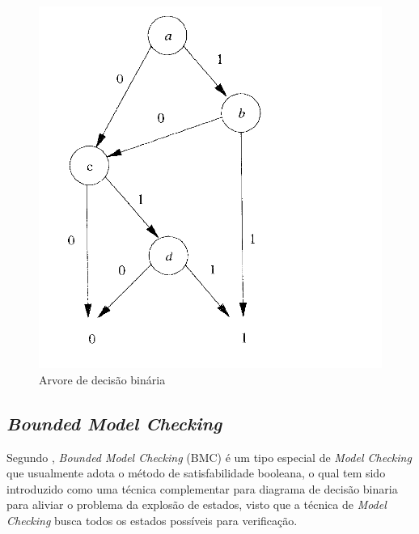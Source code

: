 \begin{figure}[htb]
	\begin{center}
    \caption{\label{fig:bdd_fig}Arvore de decisão binária}
	\includegraphics[scale=0.30]{Figuras/Arvore_BDD.png}
	\end{center}
\end{figure}



\subsection{\label{cap:bounded}\textit{Bounded Model Checking}}
Segundo \citeauthor{rocha2015verificaccao}, \textit{Bounded Model Checking} (BMC) é um tipo especial de \textit{Model Checking} que usualmente adota o método de satisfabilidade booleana, o qual tem sido introduzido como uma técnica complementar para diagrama de decisão binaria para aliviar o problema da explosão de estados, visto que a técnica de \textit{Model Checking} busca todos os estados possíveis para verificação.

